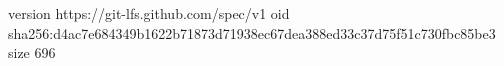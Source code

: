 version https://git-lfs.github.com/spec/v1
oid sha256:d4ac7e684349b1622b71873d71938ec67dea388ed33c37d75f51c730fbc85be3
size 696
